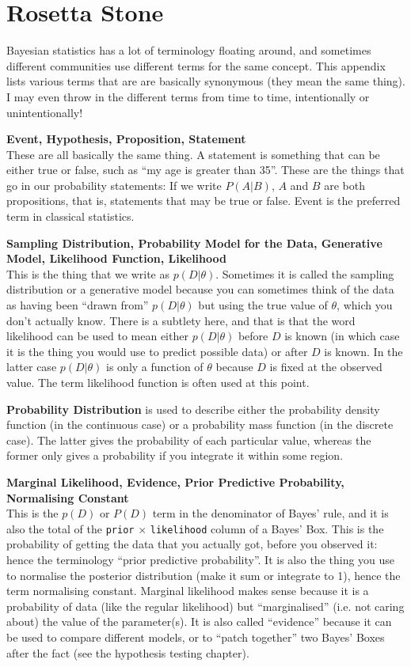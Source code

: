 \chapter{Rosetta Stone}
Bayesian statistics has a lot of terminology floating around, and sometimes
different communities use different terms for the same concept. This appendix
lists various terms that are are basically synonymous (they mean the same thing).
I may even throw in the different terms from time to time, intentionally or
unintentionally!

{\bf Event, Hypothesis, Proposition, Statement}\\
These are all basically the same thing.
A statement is something that can be either true or false, such as ``my age is
greater than 35''. These are the things that go in our
probability statements: If we write $P(A|B)$, $A$ and $B$ are both propositions,
that is, statements that may be true or false. Event is the preferred term in
classical statistics.

{\bf Sampling Distribution, Probability Model for the Data, 
Generative Model, Likelihood Function, Likelihood}\\
This is the thing that we
write as $p(D|\theta)$. Sometimes it is called the sampling distribution or
a generative model because
you can sometimes think of the data as having been ``drawn from''
$p(D|\theta)$ but using the true value of $\theta$, which you don't actually
know. There is a subtlety here, and that is that the word likelihood can be
used to mean either $p(D|\theta)$ before $D$ is known (in which case it is the
thing you would use to predict possible data) or after $D$ is known. In the latter
case $p(D|\theta)$ is only a function of $\theta$ because $D$ is fixed at the
observed value. The term likelihood function is often used at this point.

{\bf Probability Distribution} is used to describe either the probability density
function (in the continuous case) or a probability mass function (in the discrete
case). The latter gives the probability of each particular value, whereas the
former only gives a probability if you integrate it within some region.

{\bf Marginal Likelihood, Evidence, Prior Predictive Probability, Normalising
Constant}\\ This is the $p(D)$ or $P(D)$ term in the denominator of Bayes' rule,
and it is also the total of the {\tt prior} $\times$ {\tt likelihood} column
of a Bayes' Box. This is the probability of getting the data that you actually got,
before you observed it: hence the terminology ``prior predictive probability''.
It is also the thing you use to normalise the posterior distribution (make it sum
or integrate to 1), hence the term normalising constant. Marginal likelihood makes
sense because it is a probability of data (like the regular likelihood) but
``marginalised'' (i.e. not caring about) the value of the parameter(s). It is
also called ``evidence'' because it can be used to compare different models, or
to ``patch together'' two Bayes' Boxes after the fact (see the hypothesis testing
chapter).

